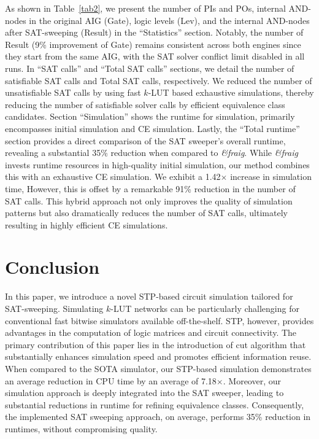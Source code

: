 \documentclass[conference]{IEEEtran}
\begin{document}
As shown in Table~\ref{tab2}, we present the number of PIs and POs, internal AND-nodes in the original AIG (Gate), logic levels (Lev), and the internal AND-nodes after SAT-sweeping (Result) in the ``Statistics'' section.
Notably, the number of Result (9\% improvement of Gate) remains consistent across both engines since they start from the same AIG, with the SAT solver conflict limit disabled in all runs.
In ``SAT calls'' and ``Total SAT calls'' sections, we detail the number of satisfiable SAT calls and Total SAT calls, respectively.
We reduced the number of unsatisfiable SAT calls by using fast $k$-LUT based exhaustive simulations, thereby reducing the number of satisfiable solver calls by efficient equivalence class candidates.
Section ``Simulation'' shows the runtime for simulation, primarily encompasses initial simulation and CE simulation.
Lastly, the ``Total runtime'' section provides a direct comparison of the SAT sweeper's overall runtime, revealing a substantial 35\% reduction when compared to \emph{\&fraig}. 
While \emph{\&fraig} invests runtime resources in high-quality initial simulation, our method combines this with an exhaustive CE simulation. 
We exhibit a 1.42$\times$ increase in simulation time, However, this is offset by a remarkable 91\% reduction in the number of SAT calls.
This hybrid approach not only improves the quality of simulation patterns but also dramatically reduces the number of SAT calls, ultimately resulting in highly efficient CE simulations.

\vspace{-2mm}
\section{Conclusion}
\label{sec7}
In this paper, we introduce a novel STP-based circuit simulation tailored for SAT-sweeping. 
Simulating $k$-LUT networks can be particularly challenging for conventional fast bitwise simulators available off-the-shelf. 
STP, however, provides advantages in the computation of logic matrices and circuit connectivity.
The primary contribution of this paper lies in the introduction of cut algorithm that substantially enhances simulation speed and promotes efficient information reuse. 
When compared to the SOTA simulator, our STP-based simulation demonstrates an average reduction in CPU time by an average of 7.18$\times$.
Moreover, our simulation approach is deeply integrated into the SAT sweeper, leading to substantial reductions in runtime for refining equivalence classes. 
Consequently, the implemented SAT sweeping approach, on average, performs 35\% reduction in runtimes, without compromising quality.
\end{document}

